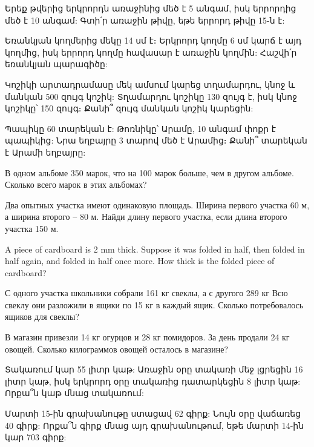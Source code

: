 







\textproblem Երեք թվերից երկրորդն առաջինից մեծ է 5 անգամ,
իսկ երրորդից մեծ է 10 անգամ: Գտի՛ր առաջին թիվը, եթե երրորդ
թիվը 15-ն է:

\textproblem Եռանկյան կողմերից մեկը 14 սմ է։ Երկրորդ կողմը
6 սմ կարճ է այդ կողմից, իսկ երրորդ կողմը հավասար է առաջին
կողմին: Հաշվի՛ր եռանկյան պարագիծը:

\textproblem Կոշիկի արտադրամասը մեկ ամսում կարեց տղամարդու,
կնոջ և մանկան 500 զույգ կոշիկ: Տղամարդու կոշիկը 130 զույգ է, իսկ
կնոջ կոշիկը՝ 150 զույգ։ Քանի՞ զույգ մանկան կոշիկ կարեցին:

\textproblem Պապիկը 60 տարեկան է: Թոռնիկը՝ Արամը, 10 անգամ
փոքր է պապիկից: Նրա եղբայրը 3 տարով մեծ է Արամից։ Քանի՞
տարեկան է Արամի եղբայրը:\answer{}

\textproblem В одном альбоме 350 марок, что на  100 марок
больше, чем в другом альбоме. Сколько  всего марок в этих
альбомах?

\textproblem  Два опытных участка имеют одинаковую площадь.
Ширина первого участка 60 м, а ширина второго – 80 м. Найди
длину первого участка, если длина второго участка 150 м.

\textproblem A piece of cardboard is 2 mm thick. Suppose
it was folded in half, then folded in half again, and
folded in half once more. How thick is the folded piece
of cardboard?

\textproblem С одного участка школьники собрали 161 кг
свеклы, а с другого 289 кг Всю свеклу они разложили в
ящики по 15 кг в каждый ящик. Сколько потребовалось
ящиков для свеклы?

\textproblem В магазин привезли 14 кг огурцов и
28 кг помидоров. За день продали 24 кг овощей.
Сколько килограммов овощей  осталось в магазине?

\problem 
Տակառում կար 55 լիտր կաթ: Առաջին օրը տակառի մեջ 
լցրեցին 16 լիտր կաթ, իսկ երկրորդ օրը տակառից 
դատարկեցին 8 լիտր կաթ: Որքա՞ն կաթ մնաց տակառում:

\problem
Մարտի 15-ին գրախանութը ստացավ 62 գիրք: Նույն օրը 
վաճառեց 40 գիրք: Որքա՞ն գիրք մնաց այդ գրախանութում, 
եթե մարտի 14-ին կար 703 գիրք:

